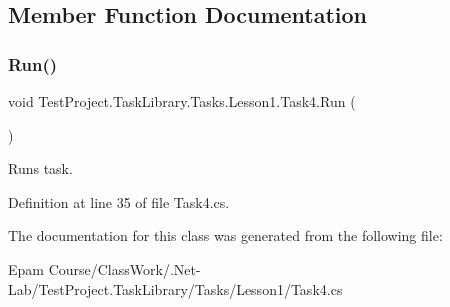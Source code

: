 \subsection{Member Function Documentation}
\mbox{\label{class_test_project_1_1_task_library_1_1_tasks_1_1_lesson1_1_1_task4_aa1ace3f933caae7f76c9eaf44536ea16}} 
\subsubsection{\texorpdfstring{Run()}{Run()}}
{\footnotesize\ttfamily void Test\+Project.\+Task\+Library.\+Tasks.\+Lesson1.\+Task4.\+Run (\begin{DoxyParamCaption}{ }\end{DoxyParamCaption})}



Runs task. 



Definition at line 35 of file Task4.\+cs.



The documentation for this class was generated from the following file\+:\begin{DoxyCompactItemize}
\item 
Epam Course/\+Class\+Work/.\+Net-\/\+Lab/\+Test\+Project.\+Task\+Library/\+Tasks/\+Lesson1/Task4.\+cs\end{DoxyCompactItemize}
